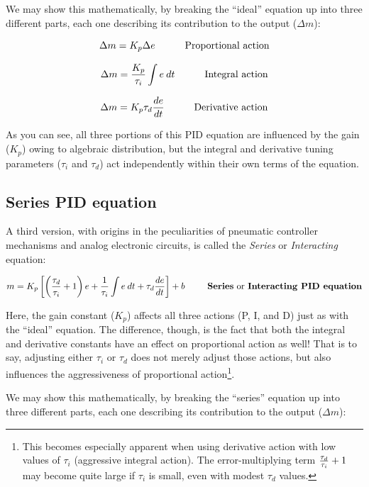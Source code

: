 We may show this mathematically, by breaking the ``ideal'' equation up into three different parts, each one describing its contribution to the output ($\Delta m$):

$$\Delta m = K_p \Delta e \hskip 30pt \hbox{Proportional action}$$

$$\Delta m = {K_p \over \tau_i} \int e \> dt \hskip 30pt \hbox{Integral action}$$

$$\Delta m = K_p \tau_d {de \over dt} \hskip 30pt \hbox{Derivative action}$$

As you can see, all three portions of this PID equation are influenced by the gain ($K_p$) owing to algebraic distribution, but the integral and derivative tuning parameters ($\tau_i$ and $\tau_d$) act independently within their own terms of the equation.







\filbreak
\subsection{Series PID equation}

A third version, with origins in the peculiarities of pneumatic controller mechanisms and analog electronic circuits, is called the \textit{Series} or \textit{Interacting} equation:    

$$m = K_p \left[ \left({\tau_d \over \tau_i} + 1 \right) e + {1 \over \tau_i} \int e \> dt + \tau_d {de \over dt} \right] + b \hbox{\hskip 25pt \textbf{Series} or \textbf{Interacting PID equation}}$$

Here, the gain constant ($K_p$) affects all three actions (P, I, and D) just as with the ``ideal'' equation.  The difference, though, is the fact that both the integral and derivative constants have an effect on proportional action as well!  That is to say, adjusting either $\tau_i$ or $\tau_d$ does not merely adjust those actions, but also influences the aggressiveness of proportional action\footnote{This becomes especially apparent when using derivative action with low values of $\tau_i$ (aggressive integral action).  The error-multiplying term ${\tau_d \over \tau_i} + 1$ may become quite large if $\tau_i$ is small, even with modest $\tau_d$ values.}.

We may show this mathematically, by breaking the ``series'' equation up into three different parts, each one describing its contribution to the output ($\Delta m$):

